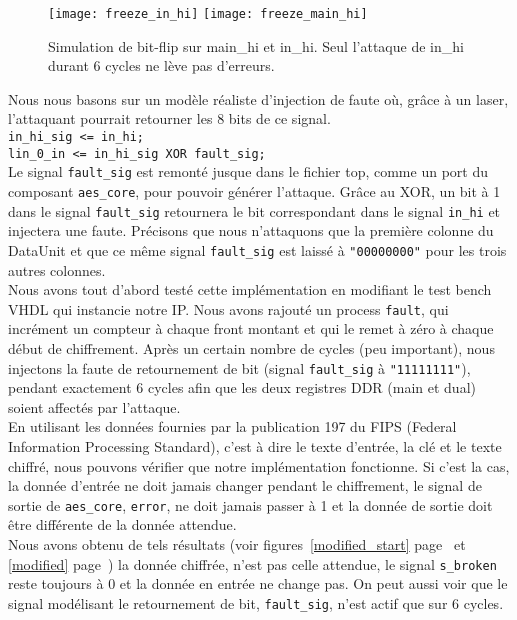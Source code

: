 \begin{figure}[!h]
	\begin{center}
		\texttt{[image: freeze\_in\_hi]}
		\texttt{[image: freeze\_main\_hi]}
		\caption{Simulation de bit-flip sur main\_hi et in\_hi. 
		Seul l'attaque de in\_hi durant 6 cycles ne lève pas d'erreurs.}
		\label{fig:freeze}
	\end{center}
\end{figure}

Nous nous basons sur un modèle réaliste d'injection de faute où, 
grâce à un laser, l'attaquant pourrait retourner les 8 bits de ce signal.\\
\texttt{in\_hi\_sig <= in\_hi;\\  lin\_0\_in <= in\_hi\_sig XOR fault\_sig;} \\
Le signal \texttt{fault\_sig} est remonté jusque dans le fichier top, comme un
port du composant \texttt{aes\_core}, pour pouvoir générer l'attaque.
Grâce au XOR, un bit à 1 dans le signal \texttt{fault\_sig} retournera le bit 
correspondant dans le signal \texttt{in\_hi} et injectera une faute.
Précisons que nous n'attaquons que la première colonne du DataUnit et que ce
même signal \texttt{fault\_sig} est laissé à \texttt{"00000000"} pour les trois
autres colonnes. \\
Nous avons tout d'abord testé cette implémentation en modifiant le test bench
VHDL qui instancie notre IP. Nous avons rajouté un process \texttt{fault},
qui incrément un compteur à chaque front montant et qui le remet à zéro à
chaque début de chiffrement. Après un certain nombre de cycles (peu important), nous injectons
la faute de retournement de bit (signal \texttt{fault\_sig} à
\texttt{"11111111"}), pendant exactement 6 cycles afin que les deux 
registres DDR (main et dual) soient affectés par l'attaque. \\
En utilisant les données fournies par la publication 197 du FIPS (Federal
Information Processing Standard), c'est à dire le texte d'entrée, 
la clé et le texte chiffré, nous pouvons vérifier que notre implémentation fonctionne. 
Si c'est la cas, la donnée d'entrée ne doit jamais changer pendant le chiffrement, le signal
de sortie de \texttt{aes\_core}, \texttt{error}, ne doit jamais passer à 1 et
la donnée de sortie doit être différente de la donnée attendue. \\
Nous avons obtenu de tels résultats (voir figures~\ref{modified_start} page~\pageref{modified_start} et
\ref{modified} page~\pageref{modified}) la donnée chiffrée, n'est pas celle attendue, le signal
\texttt{s\_broken} reste toujours à 0 et la donnée en entrée ne change pas. On
peut aussi voir que le signal modélisant le retournement de bit, \texttt{fault\_sig},
n'est actif que sur 6 cycles.

